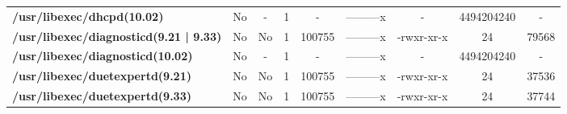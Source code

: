 \begin{center}
{\begin{tabular}{|>{\bfseries} l | C | C | C | C | C | C | C | C |}
					/usr/libexec/dhcpd(10.02) & No & - & 1 & - & ---------x & - & 4494204240 & -\\ 
					/usr/libexec/diagnosticd(9.21 | 9.33) & No & No & \color{green}1 & \color{red}100755 & \color{green}---------x & \color{red}-rwxr-xr-x & \color{green}24 & \color{red}79568\\ 
					/usr/libexec/diagnosticd(10.02) & No & - & 1 & - & ---------x & - & 4494204240 & -\\ 
					/usr/libexec/duetexpertd(9.21) & No & No & \color{green}1 & \color{red}100755 & \color{green}---------x & \color{red}-rwxr-xr-x & \color{green}24 & \color{red}37536\\ 
					/usr/libexec/duetexpertd(9.33) & No & No & \color{green}1 & \color{red}100755 & \color{green}---------x & \color{red}-rwxr-xr-x & \color{green}24 & \color{red}37744\\ 

			\end{tabular}
		}
	\end{center}



